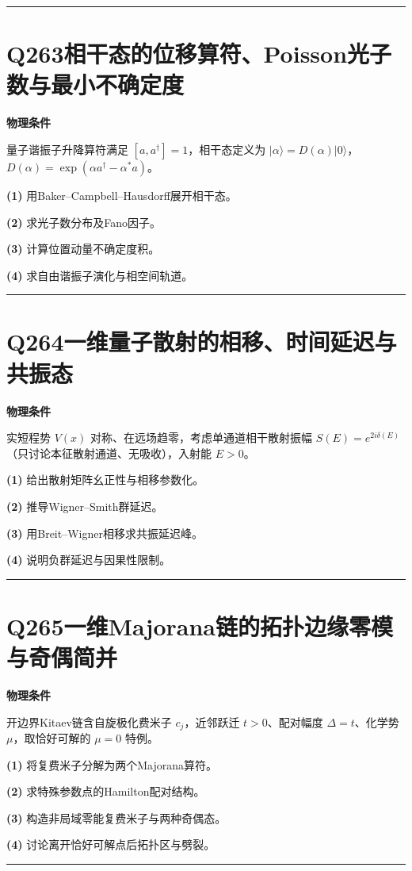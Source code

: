 \documentclass[UTF8,a4paper,11pt,oneside,openany]{ctexbook}
\begin{document}
\par\bigskip\hrule\bigskip
\section*{Q263\quad 相干态的位移算符、Poisson光子数与最小不确定度}
\textbf{物理条件}\par 量子谐振子升降算符满足 \([a,a^\dagger]=1\)，相干态定义为 \(|\alpha\rangle=D(\alpha)|0\rangle\)，\(D(\alpha)=\exp(\alpha a^\dagger-\alpha^*a)\)。
\par\noindent\textbf{(1)} 用Baker–Campbell–Hausdorff展开相干态。
\par\noindent\textbf{(2)} 求光子数分布及Fano因子。
\par\noindent\textbf{(3)} 计算位置动量不确定度积。
\par\noindent\textbf{(4)} 求自由谐振子演化与相空间轨道。

\par\bigskip\hrule\bigskip
\section*{Q264\quad 一维量子散射的相移、时间延迟与共振态}
\textbf{物理条件}\par 实短程势 \(V(x)\) 对称、在远场趋零，考虑单通道相干散射振幅 \(S(E)=e^{2i\delta(E)}\)（只讨论本征散射通道、无吸收），入射能 \(E>0\)。
\par\noindent\textbf{(1)} 给出散射矩阵幺正性与相移参数化。
\par\noindent\textbf{(2)} 推导Wigner–Smith群延迟。
\par\noindent\textbf{(3)} 用Breit–Wigner相移求共振延迟峰。
\par\noindent\textbf{(4)} 说明负群延迟与因果性限制。

\par\bigskip\hrule\bigskip
\section*{Q265\quad 一维Majorana链的拓扑边缘零模与奇偶简并}
\textbf{物理条件}\par 开边界Kitaev链含自旋极化费米子 \(c_j\)，近邻跃迁 \(t>0\)、配对幅度 \(\Delta=t\)、化学势 \(\mu\)，取恰好可解的 \(\mu=0\) 特例。
\par\noindent\textbf{(1)} 将复费米子分解为两个Majorana算符。
\par\noindent\textbf{(2)} 求特殊参数点的Hamilton配对结构。
\par\noindent\textbf{(3)} 构造非局域零能复费米子与两种奇偶态。
\par\noindent\textbf{(4)} 讨论离开恰好可解点后拓扑区与劈裂。

\par\bigskip\hrule\bigskip
\end{document}
